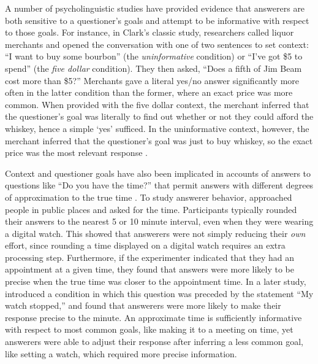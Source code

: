 \documentclass[12pt, floatsintext, jou]{apa6}
\begin{document}
A number of psycholinguistic studies have provided evidence that answerers are both sensitive to a questioner's goals and attempt to be informative with respect to those goals.
For instance, in Clark's \citeyear{Clark79_IndirectSpeechActs} classic study, researchers called liquor merchants and opened the conversation with one of two sentences to set context: ``I want to buy some bourbon'' (the \emph{uninformative} condition) or ``I've got \$5 to spend'' (the \emph{five dollar} condition). They then asked, ``Does a fifth of Jim Beam cost more than \$5?'' Merchants gave a literal yes/no answer significantly more often in the latter condition than the former, where an exact price was more common. 
When provided with the five dollar context, the merchant inferred that the questioner's goal was literally to find out whether or not they could afford the whiskey, hence a simple `yes'  sufficed. 
In the uninformative context, however, the merchant inferred that the questioner's goal was just to buy whiskey, so the exact price was the most relevant response \cite{Clark79_IndirectSpeechActs}. 

Context and questioner goals have also been implicated in accounts of answers to questions like ``Do you have the time?'' that permit answers with different degrees of approximation to the true time \cite{DerHenstCarlesSperber02_RelevanceTellingTime, GibbsBryant08_OptimalRelevance}. 
To study answerer behavior,  approached people in public places and asked for the time. Participants typically rounded their answers to the nearest 5 or 10 minute interval, even when they were wearing a digital watch. 
This showed that answerers were not simply reducing their \emph{own} effort, since rounding a time displayed on a digital watch requires an extra processing step. 
Furthermore, if the experimenter indicated that they had an appointment at a given time, they found that answers were more likely to be precise when the true time was closer to the appointment time.  
In a later study,  introduced a condition in which this question was preceded by the statement ``My watch stopped,'' and found that answerers were more likely to make their response precise to the minute. 
An approximate time is sufficiently informative with respect to most common goals, like making it to a meeting on time, yet answerers were able to adjust their response after inferring a less common goal, like setting a watch, which required more precise information.
\end{document}
